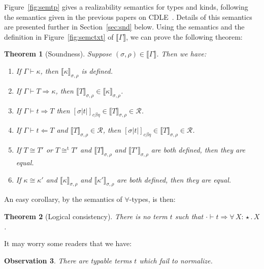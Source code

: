 \documentclass{article}
\newcommand{\abs}[4]{{#1}\, #2\! : \! #3.\, #4}
\newcommand{\interp}[1]{\llbracket #1 \rrbracket}
\newcommand{\tpcheck}[0]{\Leftarrow}
\newcommand{\tpsynth}[0]{\Rightarrow}
\newcommand{\cbe}[0]{c\beta\eta}
\newtheorem{theorem}{Theorem}
\newtheorem{observation}[theorem]{Observation}
\begin{document}
Figure~\ref{fig:semtp} gives a realizability semantics for types and
kinds, following the semantics given in the previous papers on
CDLE~\cite{stump18,stump17}.  Details of this semantics are presented
further in Section~\ref{sec:snd} below.  Using the semantics and the
definition in Figure~\ref{fig:semctxt} of $\interp{\Gamma}$, we can
prove the following theorem:
\begin{theorem}[Soundness]
\label{thm:snd}
Suppose $(\sigma,\rho)\in\interp{\Gamma}$.  Then we have:
\begin{enumerate}
\item If $\Gamma\vdash \kappa$, then $\interp{\kappa}_{\sigma,\rho}$ is defined.
\item If $\Gamma\vdash T \tpsynth \kappa$, then $\interp{T}_{\sigma,\rho}\in\interp{\kappa}_{\sigma,\rho}$.
\item If $\Gamma\vdash t \tpsynth T$ then $[\sigma |t|]_{\cbe}\in\interp{T}_{\sigma,\rho}\in \mathcal{R}$.
\item If $\Gamma\vdash t \tpcheck T$ and $\interp{T}_{\sigma,\rho}\in \mathcal{R}$, then
    $[\sigma |t|]_{\cbe}\in\interp{T}_{\sigma,\rho}\in \mathcal{R}$.
\item If $T \cong T'$ or $T \cong^{\text{t}} T'$ and $\interp{T}_{\sigma,\rho}$ and $\interp{T'}_{\sigma,\rho}$ are both defined, then they are equal.
\item If \(\kappa \cong \kappa'\) and \(\interp{\kappa}_{\sigma,\rho}\) and
  \(\interp{\kappa'}_{\sigma,\rho}\) are both defined, then they are equal.
\end{enumerate}
\end{theorem}

An easy corollary, by the semantics of $\forall$-types, is then:

\begin{theorem}[Logical consistency]
\label{thm:consis}
  There is no term $t$ such that $\cdot \vdash t \tpsynth \abs{\forall}{X}{\star}{X}$.
\end{theorem}

It may worry some readers that we have:
\begin{observation}
  There are typable terms $t$ which fail to normalize.
\end{observation}
\end{document}
